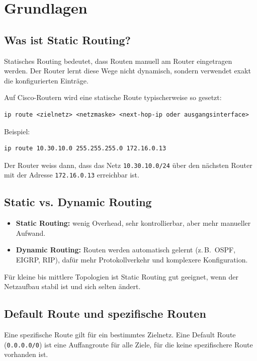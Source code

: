 \documentclass[11pt, oneside, numbers=noenddot]{scrbook}
\begin{document}

\cleardoublepage
{}
\tableofcontents
\clearpage
{}

\chapter{Grundlagen}
\section{Was ist Static Routing?}
Statisches Routing bedeutet, dass Routen manuell am Router eingetragen werden. Der Router lernt diese Wege nicht dynamisch, sondern verwendet exakt die konfigurierten Einträge.

Auf Cisco-Routern wird eine statische Route typischerweise so gesetzt:
\begin{verbatim}
ip route <zielnetz> <netzmaske> <next-hop-ip oder ausgangsinterface>
\end{verbatim}

Beispiel:
\begin{verbatim}
ip route 10.30.10.0 255.255.255.0 172.16.0.13    
\end{verbatim}
Der Router weiss dann, dass das Netz \texttt{10.30.10.0/24} über den nächsten Router mit der Adresse \texttt{172.16.0.13} erreichbar ist.

\section{Static vs. Dynamic Routing}
\begin{itemize}
\item \textbf{Static Routing:} wenig Overhead, sehr kontrollierbar, aber mehr manueller Aufwand.
\item \textbf{Dynamic Routing:} Routen werden automatisch gelernt (z.\,B.\ OSPF, EIGRP, RIP), dafür mehr Protokollverkehr und komplexere Konfiguration.
\end{itemize}

Für kleine bis mittlere Topologien ist Static Routing gut geeignet, wenn der Netzaufbau stabil ist und sich selten ändert.

\section{Default Route und spezifische Routen}
Eine spezifische Route gilt für ein bestimmtes Zielnetz. Eine Default Route (\texttt{0.0.0.0/0}) ist eine Auffangroute für alle Ziele, für die keine spezifischere Route vorhanden ist.
\end{document}
